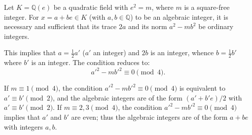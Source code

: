 Let $K = \mathbb{Q}(e)$ be a quadratic field with $e^2 = m$, where $m$ is a square-free integer. For $x = a + be \in K$ (with $a, b \in \mathbb{Q}$) to be an algebraic integer, it is necessary and sufficient that its trace $2a$ and its norm $a^2 - mb^2$ be ordinary integers.

This implies that $a = \frac{1}{2}a'$ ($a'$ an integer) and $2b$ is an integer, whence $b = \frac{1}{2}b'$ where $b'$ is an integer. The condition reduces to:
$$a'^2 - mb'^2 \equiv 0 \pmod{4}.$$

If $m \equiv 1 \pmod{4}$, the condition $a'^2 - mb'^2 \equiv 0 \pmod{4}$ is equivalent to $a' \equiv b' \pmod{2}$, and the algebraic integers are of the form $(a' + b'e)/2$ with $a' \equiv b' \pmod{2}$.
If $m \equiv 2, 3 \pmod{4}$, the condition $a'^2 - mb'^2 \equiv 0 \pmod{4}$ implies that $a'$ and $b'$ are even; thus the algebraic integers are of the form $a + be$ with integers $a, b$.
